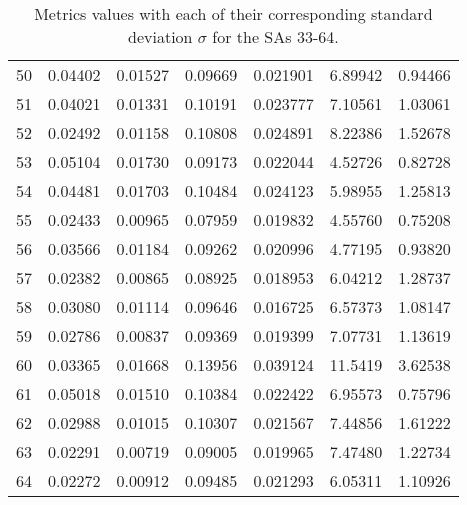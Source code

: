 \begin{table}[H]
\begin{tabular}{|l|l|l|l|l|l|l|}
		50 & 0.04402& 0.01527 & 0.09669& 0.021901 & 6.89942 & 0.94466\\
		51 & 0.04021& 0.01331 & 0.10191& 0.023777 & 7.10561 & 1.03061\\
		52 & 0.02492& 0.01158 & 0.10808& 0.024891 & 8.22386 & 1.52678\\
		53 & 0.05104& 0.01730 & 0.09173& 0.022044 & 4.52726 & 0.82728\\
		54 & 0.04481& 0.01703 & 0.10484& 0.024123 & 5.98955 & 1.25813\\
		55 & 0.02433& 0.00965 & 0.07959& 0.019832 & 4.55760 & 0.75208\\
		56 & 0.03566& 0.01184 & 0.09262& 0.020996 & 4.77195 & 0.93820\\
		57 & 0.02382& 0.00865 & 0.08925& 0.018953 & 6.04212 & 1.28737\\
		58 & 0.03080& 0.01114 & 0.09646& 0.016725 & 6.57373 & 1.08147\\
		59 & 0.02786& 0.00837 & 0.09369& 0.019399 & 7.07731 & 1.13619\\
		60 & 0.03365& 0.01668 & 0.13956& 0.039124 & 11.5419 & 3.62538\\
		61 & 0.05018& 0.01510 & 0.10384& 0.022422 & 6.95573 & 0.75796\\
		62 & 0.02988& 0.01015 & 0.10307& 0.021567 & 7.44856 & 1.61222\\
		63 & 0.02291& 0.00719 & 0.09005& 0.019965 & 7.47480 & 1.22734\\
		64 & 0.02272& 0.00912 & 0.09485& 0.021293 & 6.05311 & 1.10926\\
		\hline
		\end{tabular}
		\caption{Metrics values with each of their corresponding standard deviation $\sigma$ for the SAs 33-64.}
\end{table}
